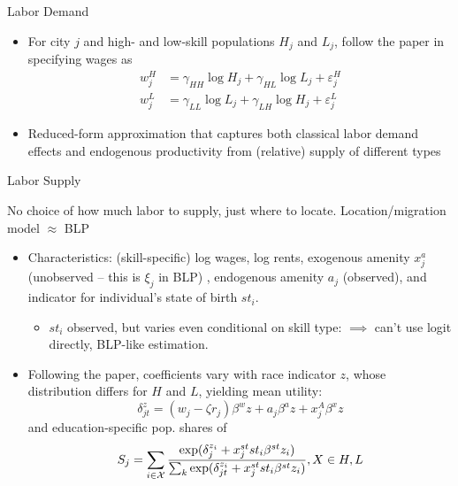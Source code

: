 \documentclass{beamer}
\begin{document}
    


 \begin{frame}{Labor Demand}

\begin{itemize}
\item For city $j$ and high- and low-skill populations $H_j$ and $L_j$, follow the paper in specifying wages as 
 \begin{align}
     w_{j}^H &= \gamma_{HH} \log H_{j} + \gamma_{HL}  \log L_{j} +  \varepsilon_{j}^H \label{eq_wage_h_aprx} 
    \\ 
     w_{j}^L &= \gamma_{LL}  \log L_{j} + \gamma_{LH}   \log H_{j} +  \varepsilon_{j}^L \label{eq_wage_l_aprx} 
\end{align}

\item Reduced-form approximation that captures both classical labor demand effects and endogenous productivity from (relative) supply of different types
\end{itemize}

\end{frame}


 \begin{frame}{Labor Supply }
 
 No choice of how much labor to supply, just where to locate. Location/migration model $\approx$ BLP
\begin{itemize}
\item Characteristics:  (skill-specific) log wages, log rents, exogenous amenity $x_{j}^a$ (unobserved -- this is  $\xi_{j}$ in BLP) , endogenous amenity $a_j$ (observed), and indicator for individual's state of birth $st_i$.
\begin{itemize}
\item $st_i$ observed, but varies even conditional on skill type: $\implies $ can't use logit directly, BLP-like estimation.
\end{itemize}

\item Following the paper, coefficients vary with race indicator $z$, whose distribution differs for $H$ and $L$, yielding mean utility: 
$$\delta_{jt}^z = (w_{j} - \zeta r_{j})\beta^w z + a_{j}\beta^a z + x_{j}^A\beta^xz$$
and education-specific pop. shares of 
\begin{equation}
S_{j} = \sum_{i\in\mathcal{X}} \frac{\exp(\delta_{j}^{z_i} + x_j^{st}st_i\beta^{st}z_i)}{\sum_{k} \exp(\delta_{jt}^{z_i} + x_j^{st}st_i\beta^{st}z_i)}, X \in {H,L} 
\end{equation}

\end{itemize}

\end{frame}
\end{document}
